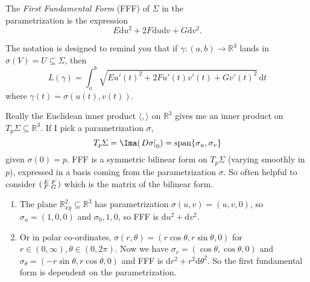 \begin{definition}
    The \textit{First Fundamental Form} (FFF) of \(\Sigma\) in the\\ parametrization is the expression
    \[
        E \mathrm{d}u^2 + 2F \mathrm{d}u\mathrm{d}v + G \mathrm{d}v^2.
    \]
\end{definition}
The notation is designed to remind you that if \(\gamma: (a,b) \to \mathbb{R}^3\) lands in \(\sigma(V) = U \subseteq \Sigma\), then
\[
    L(\gamma) = \int_{a}^{b} \sqrt{Eu'(t)^2 + 2Fu'(t)v'(t) + Gv'(t)^2}  \,\mathrm{d}t
\]
where \(\gamma(t) = \sigma(u(t), v(t))\).
\begin{remark}
    Really the Euclidean inner product \(\langle,\rangle\) on \(\mathbb{R}^3\) gives me an inner product on \(T_p\Sigma \subseteq \mathbb{R}^3\). If I pick a parametrization \(\sigma\),
    \[T_p\Sigma = \Ima(\left.D\sigma\right|_0) = \mathrm{span}\{\sigma_u, \sigma_v\}\] given \(\sigma(0) = p\).
    FFF is a symmetric bilinear form on \(T_p\Sigma\) (varying smoothly in \(p\)), expressed in a basis coming from the parametrization \(\sigma\). So often helpful to consider \(\begin{psmallmatrix}
        E &  F \\
        F &  G \\
    \end{psmallmatrix}\) which is the matrix of the bilinear form.
\end{remark}
\begin{example}
    \leavevmode
    \begin{enumerate}
        \item The plane \(\mathbb{R}^2_{xy}\subseteq \mathbb{R}^3\) has parametrization \(\sigma(u,v) = (u,v,0)\), so \(\sigma_u = (1,0,0)\) and \(\sigma_0,1,0\), so FFF is \(\mathrm{d}u^2 + \mathrm{d}v^2\).
        \item Or in polar co-ordinates, \(\sigma(r, \theta) = (r\cos \theta, r\sin \theta, 0)\) for \(r \in (0, \infty), \theta \in (0, 2\pi)\). Now we have \(\sigma_r = (\cos \theta, \cos \theta, 0)\) and \(\sigma_\theta = (-r \sin \theta, r\cos \theta, 0)\) and FFF is \(\mathrm{d}r^2 + r^2 \mathrm{d}\theta^2\). So the first fundamental form is dependent on the parametrization.
    \end{enumerate}
\end{example}